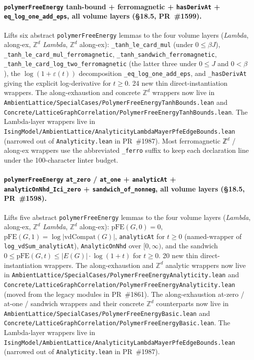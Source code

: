 \documentclass[a4paper,11pt]{article}
\begin{document}
\paragraph{\texttt{polymerFreeEnergy} tanh-bound +
ferromagnetic + \texttt{hasDerivAt} +
\texttt{eq\_log\_one\_add\_eps}, all volume layers (\S18.5,
PR~\#1599).} Lifts six abstract \texttt{polymerFreeEnergy}
lemmas to the four volume layers (\textit{Lambda}, along-ex,
$\mathbb{Z}^d$ \textit{Lambda}, $\mathbb{Z}^d$ along-ex):
\texttt{\_tanh\_le\_card\_mul} (under $0 \le \beta J$),
\texttt{\_tanh\_le\_card\_mul\_ferromagnetic},
\texttt{\_tanh\_sandwich\_ferromagnetic},
\texttt{\_tanh\_le\_card\_log\_two\_ferromagnetic} (the latter
three under $0 \le J$ and $0 < \beta$), the
$\log(1 + \varepsilon(t))$ decomposition
\texttt{\_eq\_log\_one\_add\_eps}, and \texttt{\_hasDerivAt}
giving the explicit log-derivative for $t \ge 0$. 24 new thin
direct-instantiation wrappers. The along-exhaustion and concrete
$\mathbb{Z}^d$ wrappers now live in
\texttt{AmbientLattice/SpecialCases/PolymerFreeEnergyTanhBounds.lean}
and
\texttt{Concrete/LatticeGraphCorrelation/PolymerFreeEnergyTanhBounds.lean}.
The Lambda-layer wrappers live in
\texttt{IsingModel/AmbientLattice/AnalyticityLambdaMayerPfeEdgeBounds.lean}
(narrowed out of \texttt{Analyticity.lean} in PR~\#1987).
Most ferromagnetic ℤ$^d$ /
along-ex wrappers use the abbreviated \texttt{\_ferro} suffix
to keep each declaration line under the 100-character linter
budget.

\paragraph{\texttt{polymerFreeEnergy} \texttt{at\_zero} /
\texttt{at\_one} + \texttt{analyticAt} +
\texttt{analyticOnNhd\_Ici\_zero} +
\texttt{sandwich\_of\_nonneg}, all volume layers (\S18.5,
PR~\#1598).} Lifts five abstract \texttt{polymerFreeEnergy}
lemmas to the four volume layers (\textit{Lambda}, along-ex,
$\mathbb{Z}^d$ \textit{Lambda}, $\mathbb{Z}^d$ along-ex):
$\mathrm{pFE}(G, 0) = 0$,
$\mathrm{pFE}(G, 1) = \log |\mathrm{vdCompat}(G)|$,
\texttt{analyticAt} for $t \ge 0$ (named-wrapper of
\texttt{log\_vdSum\_analyticAt}),
\texttt{AnalyticOnNhd} over $[0,\infty)$, and the sandwich
$0 \le \mathrm{pFE}(G, t) \le |E(G)| \cdot \log(1+t)$ for
$t \ge 0$. 20 new thin direct-instantiation wrappers. The
along-exhaustion and $\mathbb{Z}^d$ analytic wrappers now live in
\texttt{AmbientLattice/SpecialCases/PolymerFreeEnergyAnalyticity.lean}
and
\texttt{Concrete/LatticeGraphCorrelation/PolymerFreeEnergyAnalyticity.lean}
(moved from the legacy modules in PR~\#1861). The along-exhaustion
at-zero / at-one / sandwich wrappers and their concrete $\mathbb{Z}^d$
counterparts now live in
\texttt{AmbientLattice/SpecialCases/PolymerFreeEnergyBasic.lean}
and
\texttt{Concrete/LatticeGraphCorrelation/PolymerFreeEnergyBasic.lean}.
The Lambda-layer wrappers live in
\texttt{IsingModel/AmbientLattice/AnalyticityLambdaMayerPfeEdgeBounds.lean}
(narrowed out of \texttt{Analyticity.lean} in PR~\#1987).
\end{document}
